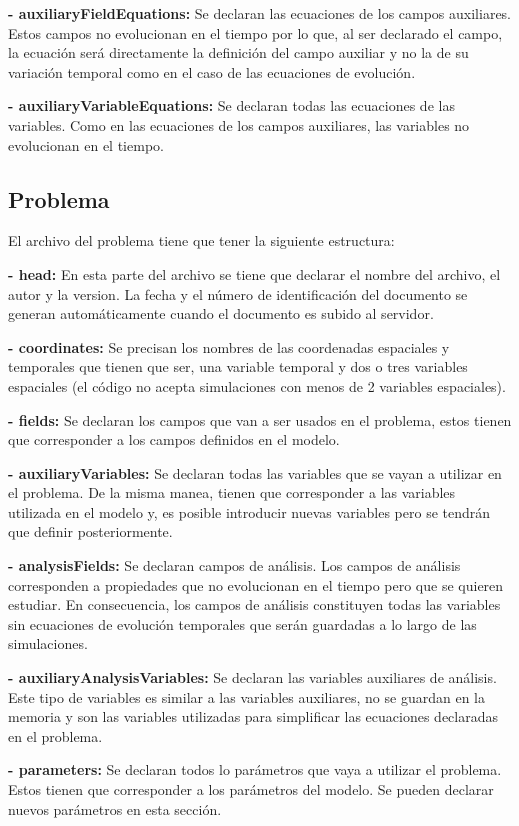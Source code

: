 \documentclass[11pt]{article}
\begin{document}
{\bf - auxiliaryFieldEquations:}
Se declaran las ecuaciones de los campos auxiliares. Estos campos no evolucionan en el tiempo por lo que, al ser declarado el campo, la ecuación será directamente la definición del campo auxiliar y no la de su variación temporal como en el caso de las ecuaciones de evolución. 

{\bf - auxiliaryVariableEquations:}
Se declaran todas las ecuaciones de las variables. Como en las ecuaciones de los campos auxiliares, las variables no evolucionan en el tiempo.
\subsection{Problema}

El archivo del problema tiene que tener la siguiente estructura:

{\bf - head:}
En esta parte del archivo se tiene que declarar el nombre del archivo, el autor y la version. La fecha y el número de  identificación del documento se generan automáticamente cuando el documento es subido al servidor.

{\bf - coordinates:}
Se precisan los nombres de las coordenadas espaciales y temporales que tienen que ser, una variable temporal y dos o tres variables espaciales (el código no acepta simulaciones con menos de 2 variables espaciales).

{\bf - fields:}
Se declaran los campos que van a ser usados en el problema, estos tienen que corresponder a los campos definidos en el modelo.

{\bf - auxiliaryVariables:}
Se declaran todas las variables que se vayan a utilizar en el problema. De la misma manea, tienen que corresponder a las variables utilizada en el modelo y, es posible introducir nuevas variables pero se tendrán que definir posteriormente.

{\bf - analysisFields:}
Se declaran campos de análisis. Los campos de análisis corresponden a propiedades que no evolucionan en el tiempo pero que se quieren estudiar. En consecuencia, los campos de análisis constituyen todas las variables sin ecuaciones de evolución temporales que serán guardadas a lo largo de las simulaciones.

{\bf - auxiliaryAnalysisVariables:}
Se declaran las variables auxiliares de análisis. Este tipo de variables es similar a las variables auxiliares, no se guardan en la memoria y son las variables utilizadas para simplificar las ecuaciones declaradas en el problema.

{\bf - parameters:}
Se declaran todos lo parámetros que vaya a utilizar el problema. Estos tienen que corresponder a los parámetros del modelo. Se pueden declarar nuevos parámetros en esta sección.
\end{document}
